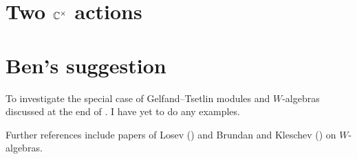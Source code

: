 \documentclass[11pt]{article}
\begin{document}
\section{Two $\mathbb C^\times$ actions}

\section{Ben's suggestion} 
To investigate the special case of  Gelfand--Tsetlin modules and $W$-algebras discussed at the end of \cite{kamnitzer2019category}. I have yet to do any examples. 

Further references include papers of Losev (\cite{losev2010finite,losev2010quantized,losev2011finite}) and Brundan and Kleschev (\cite{brundan2006shifted,brundan2009blocks}) on $W$-algebras.
%
%


%
%


%
\end{document}
